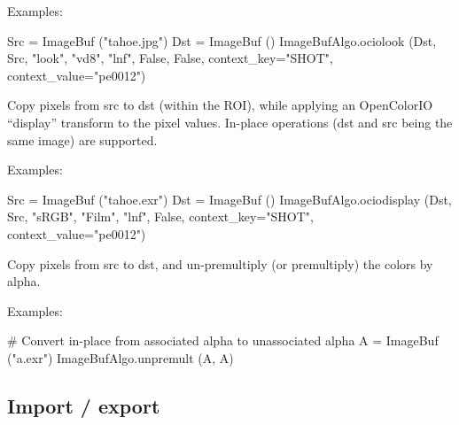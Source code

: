 \smallskip
\noindent Examples:
\begin{code}
    Src = ImageBuf ("tahoe.jpg")
    Dst = ImageBuf ()
    ImageBufAlgo.ociolook (Dst, Src, "look", "vd8", "lnf", False, False,
                            context_key="SHOT", context_value="pe0012")
\end{code}
\apiend


 
Copy pixels from {\cf src} to {\cf dst} (within the ROI), while
applying an OpenColorIO ``display'' transform to the pixel values.
In-place operations ({\cf dst} and {\cf src} being the same image)
are supported.

\smallskip
\noindent Examples:
\begin{code}
    Src = ImageBuf ("tahoe.exr")
    Dst = ImageBuf ()
    ImageBufAlgo.ociodisplay (Dst, Src, "sRGB", "Film", "lnf", False,
                              context_key="SHOT", context_value="pe0012")
\end{code}
\apiend


 
 
Copy pixels from {\cf src} to {\cf dst}, and un-premultiply (or
premultiply) the colors by alpha.

\smallskip
\noindent Examples:
\begin{code}
    # Convert in-place from associated alpha to unassociated alpha
    A = ImageBuf ("a.exr")
    ImageBufAlgo.unpremult (A, A)
\end{code}
\apiend



\subsection{Import / export}
\label{sec:iba:py:importexport}

 

